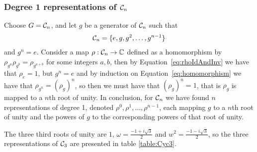 \subsubsection{Degree 1 representations of $\mathcal{C}_n$}\label{sect:deg1cycn}

Choose $G = \mathcal{C}_n$, and let $g$ be a generator of $\mathcal{C}_n$ such that 
\begin{align*}
	\mathcal{C}_n = \{ e, g, g^2, \dots, g^{n-1}\}
\end{align*}
and $g^n = e$. Consider a map $\rho: \mathcal{C}_n \rightarrow \mathbb{C}$ defined as a homomorphism by $\rho_{g^a}\rho_{g^b} = \rho_{g^{a+b}}$ for some integers $a,b$, then by Equation~\ref{eq:rhoIdAndInv} we have that $\rho_e = 1$, but $g^n = e$ and by induction on Equation~\ref{eq:homomorphism} we have that $\rho_{g^n} = (\rho_g)^n$, so then we must have that $(\rho_g)^n = 1$, that is $\rho_g$ is mapped to a $n$th root of unity.
In conclusion, for $\mathcal{C}_n$ we have found $n$ representations of degree 1, denoted $\rho^0, \rho^1, \dots, \rho^{n-1}$, each mapping $g$ to a $n$th root of unity and the powers of $g$ to the corresponding powers of that root of unity. 

\begin{example}[$\Cyc_3$]
	The three third roots of unity are $1$, $\omega = \frac{-1+i\sqrt{3}}{2}$ and $w^2 = \frac{-1-i\sqrt{3}}{2}$, so the three representations of $\Cyc_3$ are presented in table \ref{table:Cyc3}. %
	
\end{example}

